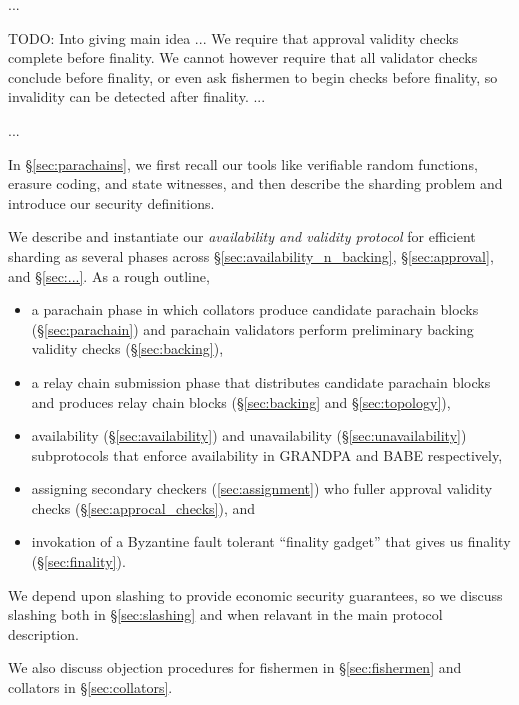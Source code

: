 

...


TODO: Into giving main idea
...
We require that approval validity checks complete before finality.  We cannot however require that all validator checks conclude before finality, or even ask fishermen to begin checks before finality, so invalidity can be detected after finality.
...

...

In \S\ref{sec:parachains}, we first recall our tools like verifiable random functions, erasure coding, and state witnesses, and then describe the sharding problem and introduce our security definitions. 

We describe and instantiate our {\em availability and validity protocol} for efficient sharding as several phases across \S\ref{sec:availability_n_backing}, \S\ref{sec:approval}, and \S\ref{sec:...}.  As a rough outline,
\begin{itemize}
\item a parachain phase in which collators produce candidate parachain blocks (\S\ref{sec:parachain}) and parachain validators perform preliminary backing validity checks (\S\ref{sec:backing}),
\item a relay chain submission phase that distributes candidate parachain blocks and produces relay chain blocks (\S\ref{sec:backing} and \S\ref{sec:topology}),
\item availability (\S\ref{sec:availability}) and unavailability (\S\ref{sec:unavailability}) subprotocols that enforce availability in GRANDPA and BABE respectively,
\item assigning secondary checkers (\ref{sec:assignment}) who fuller approval validity checks (\S\ref{sec:approcal_checks}), and
\item invokation of a Byzantine fault tolerant ``finality gadget'' that gives us finality (\S\ref{sec:finality}).
\end{itemize}
We depend upon slashing to provide economic security guarantees, so we discuss slashing both in \S\ref{sec:slashing} and when relavant in the main protocol description.

We also discuss objection procedures for fishermen in \S\ref{sec:fishermen} and collators in \S\ref{sec:collators}.

